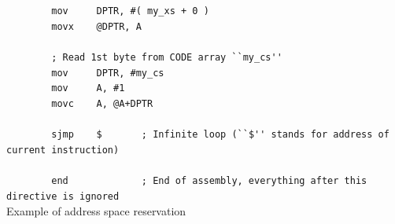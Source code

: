 \documentclass[a4paper,twoside,12pt]{book}
\begin{document}
\begin{code}[h!]
			\verb'        '{\color{highlight_instruction}\verb'mov'}\verb'     '{\color{highlight_sfr}\verb'DPTR'}{\color{highlight_oper_sep}\verb','}\verb' '{\color{highlight_symbol}\verb'#('}\verb' '{\color{highlight_constant}\verb'my_xs'}\verb' '{\color{highlight_symbol}\verb'+'}\verb' '{\color{highlight_unknown_base}\verb'0'}\verb' '{\color{highlight_symbol}\verb')'}\\
			\verb'        '{\color{highlight_instruction}\verb'movx'}\verb'    '{\color{highlight_indirect}\verb'@DPTR'}{\color{highlight_oper_sep}\verb','}\verb' '{\color{highlight_sfr}\verb'A'}\\
			\verb''\\
			\verb'        '{\color{highlight_comment}\verb'; Read 1st byte from CODE array ``my_cs'\verb"'"\verb''\verb"'"\verb''}\\
			\verb'        '{\color{highlight_instruction}\verb'mov'}\verb'     '{\color{highlight_sfr}\verb'DPTR'}{\color{highlight_oper_sep}\verb','}\verb' '{\color{highlight_imm_constant}\verb'#my_cs'}\\
			\verb'        '{\color{highlight_instruction}\verb'mov'}\verb'     '{\color{highlight_sfr}\verb'A'}{\color{highlight_oper_sep}\verb','}\verb' '{\color{highlight_imm_unknown}\verb'#1'}\\
			\verb'        '{\color{highlight_instruction}\verb'movc'}\verb'    '{\color{highlight_sfr}\verb'A'}{\color{highlight_oper_sep}\verb','}\verb' '{\color{highlight_indirect}\verb'@A+DPTR'}\\
			\verb''\\
			\verb'        '{\color{highlight_instruction}\verb'sjmp'}\verb'    '{\color{highlight_constant}\verb'$'}\verb'       '{\color{highlight_comment}\verb'; Infinite loop (``$'\verb"'"\verb''\verb"'"\verb' stands for address of current instruction)'}\\
			\verb''\\
			\verb'        '{\color{highlight_directive}\verb'end'}\verb'             '{\color{highlight_comment}\verb'; End of assembly, everything after this directive is ignored'}\\
			\caption{Example of address space reservation}
		\end{code}
\end{document}
